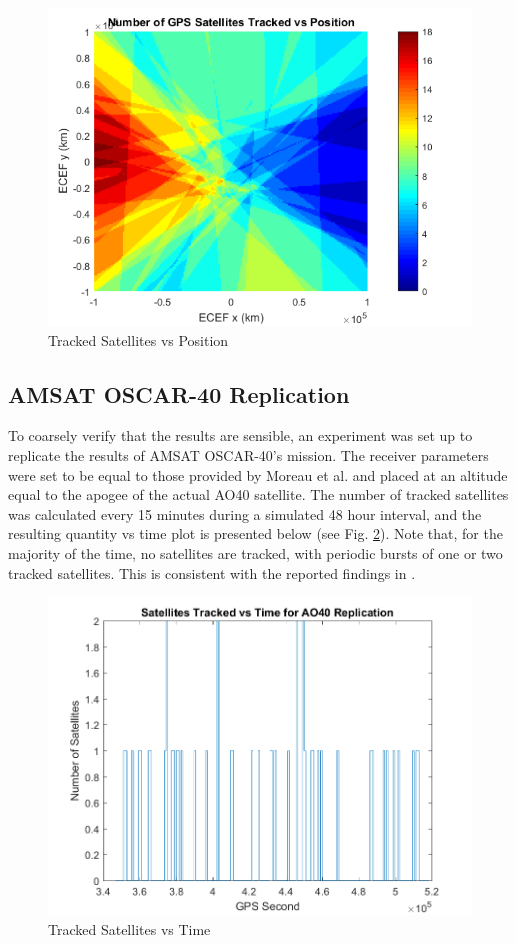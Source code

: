 \documentclass[11pt]{article}
\begin{document}
\begin{figure}[h]
\centering
\includegraphics[width=.75\textwidth]{../Images/many.png}
\caption{Tracked Satellites vs Position}
\label{fig:many}
\end{figure}

\FloatBarrier
\subsection{AMSAT OSCAR-40 Replication}
To coarsely verify that the results are sensible, an experiment was set up to replicate the results of AMSAT OSCAR-40's mission. The receiver parameters were set to be equal to those provided by Moreau et al. and placed at an altitude equal to the apogee of the actual AO40 satellite. The number of tracked satellites was calculated every 15 minutes during a simulated 48 hour interval, and the resulting quantity vs time plot is presented below (see Fig. \ref{fig:ao40copy}). Note that, for the majority of the time, no satellites are tracked, with periodic bursts of one or two tracked satellites. This is consistent with the reported findings in \cite{ao40}.

\begin{figure}[h]
\centering
\includegraphics[width=.66\textwidth]{../Images/ao40actual.png}
\caption{Tracked Satellites vs Time}
\label{fig:ao40copy}
\end{figure}
\end{document}

